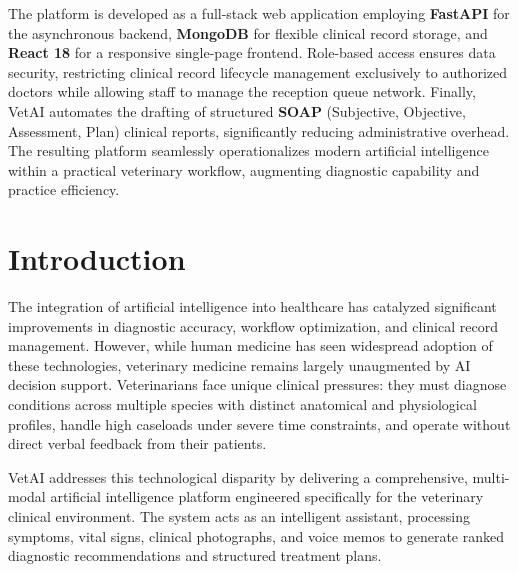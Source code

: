 \documentclass[a4paper,12pt]{report}
\begin{document}
The platform is developed as a full-stack web application employing \textbf{FastAPI} for the asynchronous backend, \textbf{MongoDB} for flexible clinical record storage, and \textbf{React 18} for a responsive single-page frontend. Role-based access ensures data security, restricting clinical record lifecycle management exclusively to authorized doctors while allowing staff to manage the reception queue network. Finally, VetAI automates the drafting of structured \textbf{SOAP} (Subjective, Objective, Assessment, Plan) clinical reports, significantly reducing administrative overhead. The resulting platform seamlessly operationalizes modern artificial intelligence within a practical veterinary workflow, augmenting diagnostic capability and practice efficiency.

\newpage

\tableofcontents
\newpage
\listoffigures
\newpage
\listoftables

\newpage
{}
\pagestyle{fancy}
\fancyhf{}
\fancyfoot[C]{\small\thepage}
\renewcommand{\headrulewidth}{0.4pt}
\renewcommand{\footrulewidth}{0.4pt}

\chapter{Introduction}

The integration of artificial intelligence into healthcare has catalyzed significant improvements in diagnostic accuracy, workflow optimization, and clinical record management. However, while human medicine has seen widespread adoption of these technologies, veterinary medicine remains largely unaugmented by AI decision support. Veterinarians face unique clinical pressures: they must diagnose conditions across multiple species with distinct anatomical and physiological profiles, handle high caseloads under severe time constraints, and operate without direct verbal feedback from their patients. 

VetAI addresses this technological disparity by delivering a comprehensive, multi-modal artificial intelligence platform engineered specifically for the veterinary clinical environment. The system acts as an intelligent assistant, processing symptoms, vital signs, clinical photographs, and voice memos to generate ranked diagnostic recommendations and structured treatment plans.
\end{document}
